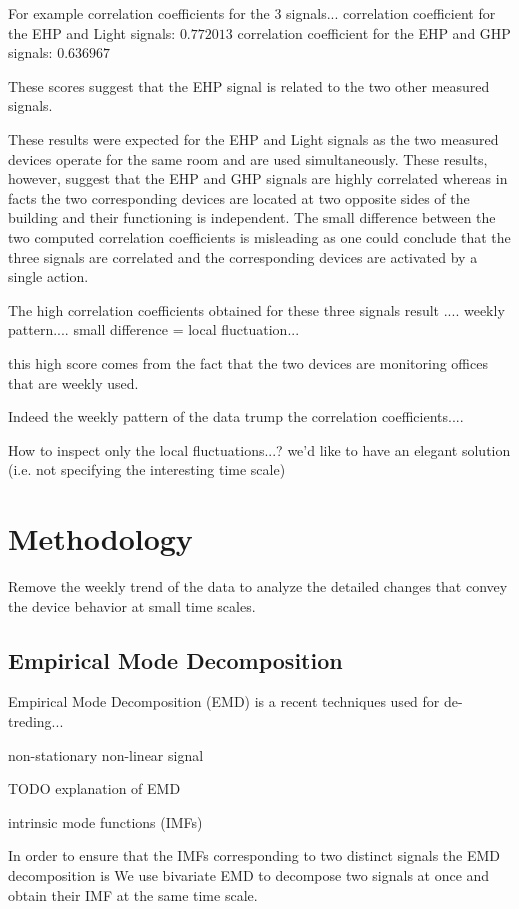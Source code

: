 \documentclass[letter,10pt]{sig-alternate-10pt}
\begin{document}
For example correlation coefficients for the 3 signals...
correlation coefficient for the EHP and Light signals: $0.772013$
correlation coefficient for the EHP and GHP signals: $0.636967$

These scores suggest that the EHP signal is related to the two other measured signals.

These results were expected for the EHP and Light signals as the two measured devices operate for the same room and are used simultaneously.
These results, however, suggest that the EHP and GHP signals are highly correlated whereas in facts the two corresponding devices are located at two opposite sides of the building and their functioning is independent.
The small difference between the two computed correlation coefficients is misleading as one could conclude that the three signals are correlated and the corresponding devices are activated by a single action.

The high correlation coefficients obtained for these three signals result .... weekly pattern....
small difference = local fluctuation...

this high score comes from the fact that the two devices are monitoring offices that are weekly used.

Indeed the weekly pattern of the data trump the correlation coefficients....

How to inspect only the local fluctuations...?
we'd like to have an elegant solution (i.e. not specifying the interesting time scale)


\newpage

\section{Methodology}\label{method}
Remove the weekly trend of the data to analyze the detailed changes that convey the device behavior at small time scales.

\subsection{Empirical Mode Decomposition}

Empirical Mode Decomposition (EMD) \cite{huang:emd1998} is a recent techniques used for de-treding...

non-stationary non-linear signal

TODO explanation of EMD


intrinsic mode functions (IMFs)

In order to ensure that the IMFs corresponding to two distinct signals the EMD decomposition is 
We use bivariate EMD \cite{rilling:biemd2007} to decompose two signals at once and obtain their IMF at the same time scale.
\end{document}
